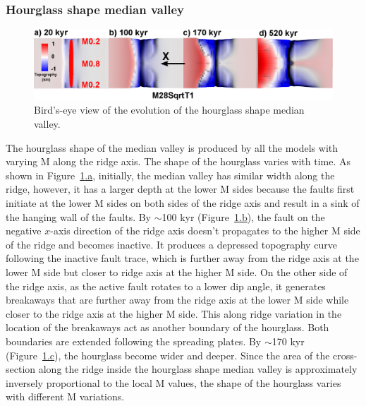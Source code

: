 \subsubsection{Hourglass shape median valley}

\begin{figure}[h]
  \centering
    \includegraphics[width=1.0\textwidth]{./Figures/fig_Results_3_2_hourglass_evolution.eps}
  \caption{Bird's-eye view of the evolution of the hourglass shape median valley.}
 \label{fig_Results_3_2_hourglass_evolution}
\end{figure}

The hourglass shape of the median valley is produced by all the models with varying M along the ridge axis. The shape of the hourglass varies with time. As shown in Figure~\hyperref[fig_Results_3_2_hourglass_evolution]{\ref{fig_Results_3_2_hourglass_evolution}.a}, initially, the median valley has similar width along the ridge, however, it has a larger depth at the lower M sides because the faults first initiate at the lower M sides on both sides of the ridge axis and result in a sink of the hanging wall of the faults. By $\sim$100 kyr (Figure~\hyperref[fig_Results_3_2_hourglass_evolution]{\ref{fig_Results_3_2_hourglass_evolution}.b}), the fault on the negative $x$-axis direction of the ridge axis doesn't propagates to the higher M side of the ridge and becomes inactive. It produces a depressed topography curve following the inactive fault trace, which is further away from the ridge axis at the lower M side but closer to ridge axis at the higher M side. On the other side of the ridge axis, as the active fault rotates to a lower dip angle, it generates breakaways that are further away from the ridge axis at the lower M side while closer to the ridge axis at the higher M side. This along ridge variation in the location of the breakaways act as another boundary of the hourglass. Both boundaries are extended following the spreading plates. By $\sim$170 kyr (Figure~\hyperref[fig_Results_3_2_hourglass_evolution]{\ref{fig_Results_3_2_hourglass_evolution}.c}), the hourglass become wider and deeper. Since the area of the cross-section along the ridge inside the hourglass shape median valley is approximately inversely proportional to the local M values, the shape of the hourglass varies with different M variations.

